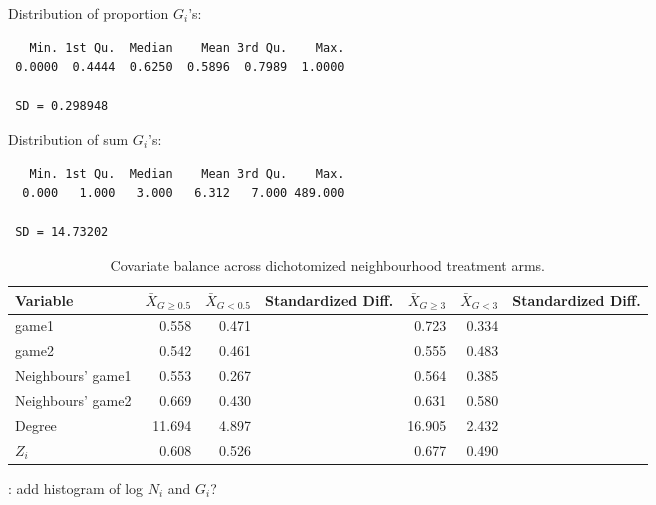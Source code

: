 \documentclass[10pt]{article}
\begin{document}
Distribution of proportion $G_i$'s:
\begin{verbatim}
   Min. 1st Qu.  Median    Mean 3rd Qu.    Max. 
 0.0000  0.4444  0.6250  0.5896  0.7989  1.0000
 
 SD = 0.298948
\end{verbatim}

Distribution of sum $G_i$'s:
\begin{verbatim}
   Min. 1st Qu.  Median    Mean 3rd Qu.    Max. 
  0.000   1.000   3.000   6.312   7.000 489.000 
  
 SD = 14.73202
\end{verbatim}

\begin{table}[H]
\centering
\begin{tabular}{@{}lrrrrrr@{}}
\toprule
Variable & $\bar{X}_{G\geq0.5}$ & $\bar{X}_{G<0.5}$ & Standardized Diff. & $\bar{X}_{G\geq3}$ & $\bar{X}_{G<3}$ & Standardized Diff. \\
\midrule
game1 & 0.558 & 0.471 & & 0.723 & 0.334 & \\
game2 & 0.542 & 0.461 & & 0.555 & 0.483 & \\
Neighbours' game1 & 0.553 & 0.267 & & 0.564 & 0.385 & \\
Neighbours' game2 & 0.669 & 0.430 & & 0.631 & 0.580 & \\
Degree & 11.694 & 4.897 & & 16.905 & 2.432 & \\
$Z_i$ & 0.608 & 0.526 & & 0.677 & 0.490 & \\
\bottomrule
\end{tabular}
\caption{Covariate balance across dichotomized neighbourhood treatment arms.}
\end{table}

\todo: add histogram of log $N_i$ and $G_i$?
\end{document}
